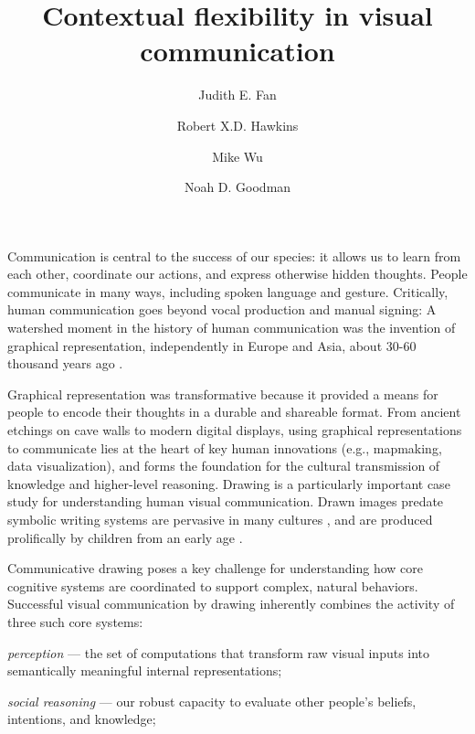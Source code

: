 \documentclass[9pt,twocolumn,twoside]{pnas-new}
\title{Contextual flexibility in visual communication}
\author[a,1,*]{Judith E. Fan}
\author[a,*]{Robert X.D. Hawkins}
\author[b]{Mike Wu}
\author[a,b]{Noah D. Goodman}
\affil[a]{Department of Psychology, Stanford University}
\affil[b]{Department of Computer Science, Stanford University}
\affil[*]{These authors contributed equally to this work.}
\begin{document}
\verticaladjustment{-2pt}

\maketitle
\thispagestyle{firststyle}

Communication is central to the success of our species: it allows us to learn from each other, coordinate our actions, and express otherwise hidden thoughts. People communicate in many ways, including spoken language and gesture. Critically, human communication goes beyond vocal production and manual signing: A watershed moment in the history of human communication was the invention of graphical representation, independently in Europe and Asia, about 30-60 thousand years ago \cite{hoffmann2018u,Aubert:2014jy}.

Graphical representation was transformative because it provided a means for people to encode their thoughts in a durable and shareable format. From ancient etchings on cave walls to modern digital displays, using graphical representations to communicate lies at the heart of key human innovations (e.g., mapmaking, data visualization), and forms the foundation for the cultural transmission of knowledge and higher-level reasoning. Drawing is a particularly important case study for understanding human visual communication. Drawn images predate symbolic writing systems \cite{clottes2008cave} are pervasive in many cultures \cite{gombrich1989story}, and are produced prolifically by children from an early age \cite{kellogg1969analyzing}.


Communicative drawing poses a key challenge for understanding how core cognitive systems are coordinated to support complex, natural behaviors. Successful visual communication by drawing inherently combines the activity of three such core systems:

\textit{perception} --- the set of computations that transform raw visual inputs into semantically meaningful internal representations;

\textit{social reasoning} --- our robust capacity to evaluate other people's beliefs, intentions, and knowledge;
\end{document}

